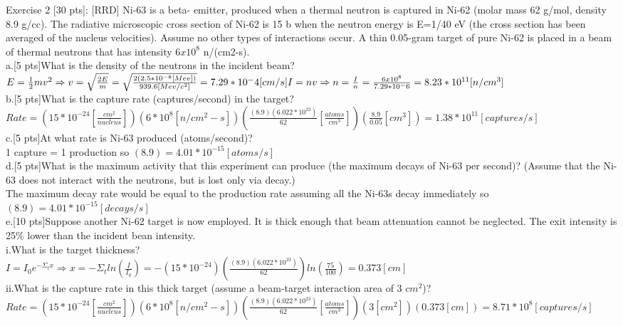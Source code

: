 \documentclass[12pt,fleqn, parskip=full]{scrartcl}
\begin{document}
Exercise 2 [30 pts]: [RRD] Ni-63 is a beta- emitter, produced when a thermal neutron is captured in Ni-62 (molar mass 62 g/mol, density 8.9 g/cc). The radiative microscopic cross section of Ni-62 is 15 b when the neutron energy is E=1/40 eV (the cross section has been averaged of the nucleus velocities).  Assume no other types of interactions occur. A thin 0.05-gram target of pure Ni-62 is placed in a beam of thermal neutrons that has intensity $6x10^8$ n/(cm2-s). \\
a.[5 pts]What is the density of the neutrons in the incident beam?\\
$E= \frac{1}{2}mv^2 \Rightarrow v = \sqrt{\frac{2E}{m}} = \sqrt{\frac{2(2.5*10^{-8}[Mev])}{939.6[Mev/c^2]}} = 7.29*10^-4 [cm/s]\\
I=nv \Rightarrow n = \frac{I}{n} = \frac{6x10^8}{7.29*10^-6} = 8.23*10^{11} [n/cm^3]$\\
b.[5 pts]What is the capture rate (captures/second) in the target?\\
$Rate = (15*10^{-24}[\frac{cm^2}{nucleus}])(6*10^8 [n/cm^2-s])(\frac{(8.9)(6.022*10^{23})}{62} [\frac{atoms}{cm^3}])(\frac{8.9}{0.05} [cm^3]) =  1.38*10^{11} [captures/s]$\\
c.[5 pts]At what rate is Ni-63 produced (atoms/second)?\\
1 capture = 1 production so $(8.9)=4.01*10^{-15} [atoms/s]$\\
d.[5 pts]What is the maximum activity that this experiment can produce (the maximum decays of Ni-63 per second)? (Assume that the Ni-63 does not interact with the neutrons, but is lost only via decay.)\\
The maximum decay rate would be equal to the production rate assuming all the Ni-63s decay immediately so $(8.9)=4.01*10^{-15} [decays/s]$\\
e.[10 pts]Suppose another Ni-62 target is now employed. It is thick enough that beam attenuation cannot be neglected. The exit intensity is 25\% lower than the incident bean intensity.\\
i.What is the target thickness?\\
$I=I_0e^{-\Sigma_t x} \Rightarrow x = -\Sigma_t ln(\frac{I}{I_0}) = -(15*10^{-24})(\frac{(8.9)(6.022*10^{23})}{62})ln(\frac{75}{100}) = 0.373 [cm]$ \\
ii.What is the capture rate in this thick target (assume a beam-target interaction area of 3 $cm^2$)?\\
$Rate = (15*10^{-24}[\frac{cm^2}{nucleus}])(6*10^8 [n/cm^2-s])(\frac{(8.9)(6.022*10^{23})}{62} [\frac{atoms}{cm^3}])(3 [cm^2])(0.373 [cm]) =  8.71*10^8 [captures/s]$\\
\end{document}
